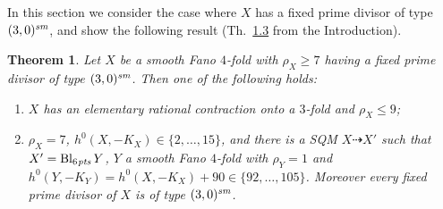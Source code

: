\documentclass[10pt,a4paper]{amsart}
\newtheorem{thm}{Theorem}[section]
\theoremstyle{definition}
\numberwithin{figure}{section}
\numberwithin{table}{section}
\newcommand{\Bl}{\operatorname{Bl}}
\newcommand{\sm}{\text{\it sm}}
\newcommand{\pts}{\text{\it pts}}
\begin{document}
In this section we consider the case where $X$ has a fixed prime divisor of type $(3,0)^{\sm}$, and show the following result (Th.~\href{https://arxiv.org/abs/2508.21207v1}{1.3} from the Introduction).
\begin{thm}\label{30}
Let $X$ be a smooth Fano $4$-fold with $\rho_X\geq 7$ having a fixed prime divisor of type $(3,0)^{\sm}$. Then one of the following holds:
  \begin{enumerate}[$(i)$]
  \item  $X$ has an elementary rational contraction onto a $3$-fold and $\rho_X\leq 9$;
  \item $\rho_X=7$,
$h^0(X,-K_X)\in\{2,\dotsc,15\}$,
and there is a SQM $X\dasharrow X'$ such that $X'=\Bl_{6\mskip1mu\pts}Y$, $Y$ a smooth Fano $4$-fold with $\rho_Y=1$ and $h^0(Y,-K_Y)=h^0(X,-K_X)+90\in\{92,\dotsc, 105\}$. Moreover every fixed prime divisor of $X$ is of type $(3,0)^{\sm}$.
    \end{enumerate}
\end{thm}
\end{document}
